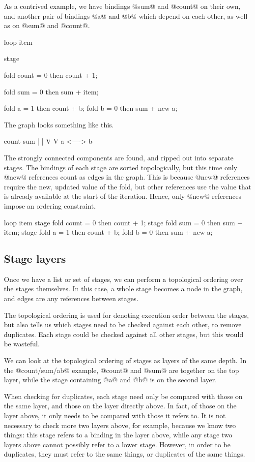 As a contrived example, we have bindings @sum@ and @count@ on their own, and another pair of bindings @a@ and @b@ which depend on each other, as well as on @sum@ and @count@.
\begin{code}
loop item {
  stage {
    fold count = 0 then count + 1;

    fold sum   = 0 then sum   + item;

    fold a     = 1 then count + b;
    fold b     = 0 then sum + new a;
  }
}
\end{code}

The graph looks something like this.
\begin{code}
  count     sum
    |        |
    V        V
    a <----> b
\end{code}

The strongly connected components are found, and ripped out into separate stages.
The bindings of each stage are sorted topologically, but this time only @new@ references count as edges in the graph.
This is because @new@ references require the new, updated value of the fold, but other references use the value that is already available at the start of the iteration.
Hence, only @new@ references impose an ordering constraint.
\begin{code}
loop item {
  stage {
    fold count = 0 then count + 1;
  }
  stage {
    fold sum   = 0 then sum   + item;
  }
  stage {
    fold a     = 1 then count + b;
    fold b     = 0 then sum + new a;
  }
}
\end{code}

\subsection{Stage layers}
Once we have a list or set of stages, we can perform a topological ordering over the stages themselves.
In this case, a whole stage becomes a node in the graph, and edges are any references between stages.

The topological ordering is used for denoting execution order between the stages, but also tells us which stages need to be checked against each other, to remove duplicates.
Each stage could be checked against all other stages, but this would be wasteful.

We can look at the topological ordering of stages as layers of the same depth.
In the @count/sum/ab@ example, @count@ and @sum@ are together on the top layer, while the stage containing @a@ and @b@ is on the second layer.

When checking for duplicates, each stage need only be compared with those on the same layer, and those on the layer directly above.
In fact, of those on the layer above, it only needs to be compared with those it refers to.
It is not necessary to check more two layers above, for example, because we know two things:
this stage refers to a binding in the layer above, while any stage two layers above cannot possibly refer to a lower stage.
However, in order to be duplicates, they must refer to the same things, or duplicates of the same things.


